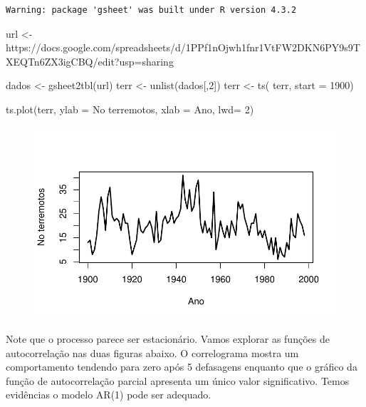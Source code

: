 \documentclass[
  letterpaper,
  DIV=11,
  numbers=noendperiod]{scrartcl}
\newenvironment{Shaded}{\begin{snugshade}}{\end{snugshade}}
\newcommand{\AttributeTok}[1]{\textcolor[rgb]{0.40,0.45,0.13}{#1}}
\newcommand{\DecValTok}[1]{\textcolor[rgb]{0.68,0.00,0.00}{#1}}
\newcommand{\FunctionTok}[1]{\textcolor[rgb]{0.28,0.35,0.67}{#1}}
\newcommand{\NormalTok}[1]{\textcolor[rgb]{0.00,0.23,0.31}{#1}}
\newcommand{\OtherTok}[1]{\textcolor[rgb]{0.00,0.23,0.31}{#1}}
\newcommand{\StringTok}[1]{\textcolor[rgb]{0.13,0.47,0.30}{#1}}
\theoremstyle{plain}
\theoremstyle{plain}
\theoremstyle{definition}
\theoremstyle{definition}
\theoremstyle{remark}
\begin{document}
\begin{verbatim}
Warning: package 'gsheet' was built under R version 4.3.2
\end{verbatim}

\begin{Shaded}
\begin{Highlighting}[]
\NormalTok{url }\OtherTok{\textless{}{-}} \StringTok{\textquotesingle{}https://docs.google.com/spreadsheets/d/1PPf1nOjwh1fnr1VtFW2DKN6PY9s9TXEQTn6ZX3igCBQ/edit?usp=sharing\textquotesingle{}}

\NormalTok{dados }\OtherTok{\textless{}{-}} \FunctionTok{gsheet2tbl}\NormalTok{(url)}
\NormalTok{terr }\OtherTok{\textless{}{-}} \FunctionTok{unlist}\NormalTok{(dados[,}\DecValTok{2}\NormalTok{]) }
\NormalTok{terr }\OtherTok{\textless{}{-}} \FunctionTok{ts}\NormalTok{( terr, }\AttributeTok{start =} \DecValTok{1900}\NormalTok{)}

\FunctionTok{ts.plot}\NormalTok{(terr, }\AttributeTok{ylab =} \StringTok{\textquotesingle{}No terremotos\textquotesingle{}}\NormalTok{, }\AttributeTok{xlab =} \StringTok{\textquotesingle{}Ano\textquotesingle{}}\NormalTok{, }\AttributeTok{lwd=} \DecValTok{2}\NormalTok{)}
\end{Highlighting}
\end{Shaded}

\begin{figure}[H]

{\centering \includegraphics{processo_linear_geral_files/figure-pdf/unnamed-chunk-4-1.pdf}

}

\end{figure}

Note que o processo parece ser estacionário. Vamos explorar as funções
de autocorrelação nas duas figuras abaixo. O correlograma mostra um
comportamento tendendo para zero após 5 defasagens enquanto que o
gráfico da função de autocorrelação parcial apresenta um único valor
significativo. Temos evidências o modelo AR(1) pode ser adequado.
\end{document}
